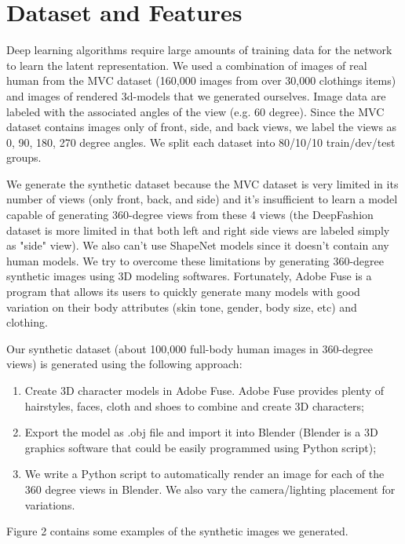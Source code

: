 \documentclass[10pt,conference]{IEEEtran}
\begin{document}
\section{Dataset and Features}

Deep learning algorithms require large amounts of training data for the network to learn the latent representation. We used a combination of images of real human from the MVC \autocite{liu2016mvc} dataset (160,000 images from over 30,000 clothings items) and images of rendered 3d-models that we generated ourselves. Image data are labeled with the associated angles of the view (e.g. 60 degree). Since the MVC dataset contains images only of front, side, and back views, we label the views as 0, 90, 180, 270 degree angles. We split each dataset into 80/10/10 train/dev/test groups.

We generate the synthetic dataset because the MVC dataset is very limited in its number of views (only front, back, and side) and it's insufficient to learn a model capable of generating 360-degree views from these 4 views (the DeepFashion dataset \autocite{liu2016deepfashion} is more limited in that both left and right side views are labeled simply as "side" view). We also can't use ShapeNet \autocite{chang2015shapenet} models since it doesn't contain any human models. We try to overcome these limitations by generating 360-degree synthetic images using 3D modeling softwares. Fortunately, Adobe Fuse is a program that allows its users to quickly generate many models with good variation on their body attributes (skin tone, gender, body size, etc) and clothing.

Our synthetic dataset (about 100,000 full-body human images in 360-degree views) is generated using the following approach:
\renewcommand{\labelenumi}{\roman{enumi}}
 \begin{enumerate}
   \item Create 3D character models in Adobe Fuse. Adobe Fuse provides plenty of hairstyles, faces, cloth and shoes to combine and create 3D characters;
   \item Export the model as .obj file and import it into Blender (Blender is a 3D graphics software that could be easily programmed using Python script);
   \item We write a Python script to automatically render an image for each of the 360 degree views in Blender. We also vary the camera/lighting placement for variations. 
 \end{enumerate}

Figure 2 contains some examples of the synthetic images we generated.
\end{document}
